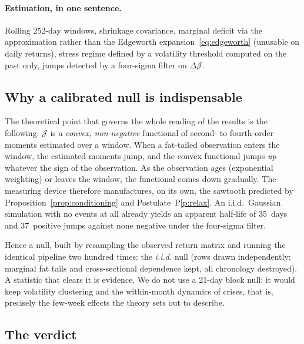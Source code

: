 \documentclass[11pt]{article}
\theoremstyle{definition}
\theoremstyle{remark}
\newcommand{\JJ}{\mathcal{J}}
\begin{document}
\paragraph{Estimation, in one sentence.} Rolling 252-day windows,
\citet{ledoit2004} shrinkage covariance, marginal deficit via the
\citet{hyvarinen1998} approximation rather than the Edgeworth
expansion~\eqref{eq:edgeworth} (unusable on daily returns), stress regime
defined by a volatility threshold computed on the past only, jumps detected by a
four-sigma filter on $\Delta\JJ$.

\subsection{Why a calibrated null is indispensable}

The theoretical point that governs the whole reading of the results is the
following. $\JJ$ is a \emph{convex, non-negative} functional of second- to
fourth-order moments estimated over a window. When a fat-tailed observation
enters the window, the estimated moments jump, and the convex functional jumps
\emph{up} whatever the sign of the observation. As the observation ages
(exponential weighting) or leaves the window, the functional comes down
gradually. The measuring device therefore manufactures, on its own, the
sawtooth predicted by Proposition~\ref{prop:conditioning} and
Postulate~P\ref{p:relax}. An i.i.d.\ Gaussian simulation with no events at all
already yields an apparent half-life of 35~days and 37~positive jumps against
none negative under the four-sigma filter.

Hence a null, built by resampling the observed return matrix and running the
identical pipeline two hundred times: the \emph{i.i.d.} null (rows drawn
independently; marginal fat tails and cross-sectional dependence kept, all
chronology destroyed). A statistic that clears it is evidence. We do not use a
21-day block null: it would keep volatility clustering and the within-month
dynamics of crises, that is, precisely the few-week effects the theory sets out
to describe.

\subsection{The verdict}
\end{document}
